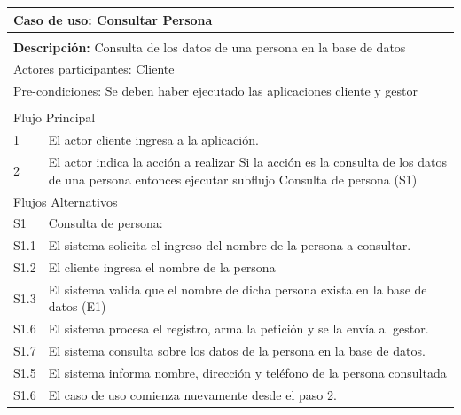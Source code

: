 \documentclass[11pt]{article}
\begin{document}
\begin{tabular}{|l|m{}|}
    \hline
    \multicolumn{2}{|m{0.9\textwidth}|}{{\bf Caso de uso: Consultar Persona}} \\
    \hline
    \multicolumn{2}{|l|}{\rowcolor[gray]{.5}} \\
    \hline
  
    \multicolumn{2}{|p{0.9\textwidth}|}{{\bf Descripción:} Consulta de los datos de una 
    persona en la base de datos } \\
  
    \hline
    \multicolumn{2}{|l|}{Actores participantes: Cliente} \\
    \hline
  
    \multicolumn{2}{|l|}{Pre-condiciones: Se deben haber ejecutado las aplicaciones cliente 
    y gestor} \\
  
    \hline
    \multicolumn{2}{|l|}{\rowcolor[gray]{.5}} \\
    \hline
    \multicolumn{2}{|l|}{Flujo Principal} \\
    \hline
    1 & El actor cliente ingresa a la aplicaci\'on. \\
    \hline
    2 &  El actor indica la acción a realizar \newline
    Si la acción es la consulta de los datos de una persona entonces ejecutar subflujo Consulta de persona (S1)\newline
   \\
    
    \hline
    \multicolumn{2}{|l|}{Flujos Alternativos} \\
    \hline
  
    S1 &  Consulta de persona: \\ \hline
    S1.1 & El sistema solicita el ingreso del nombre de la persona a consultar.\\ \hline
    S1.2 & El cliente ingresa el nombre de la persona\\ \hline
    S1.3 & El sistema valida que el nombre de dicha persona exista en la base de datos (E1) \\ \hline
    S1.6 & El sistema procesa el registro, arma la petici\'on y se la env\'ia al gestor.\\ \hline
    S1.7 & El sistema consulta sobre los datos de la persona en la base de datos.\\ \hline
    S1.5 & El sistema informa nombre, direcci\'on y tel\'efono de la persona consultada\\ \hline
    S1.6 & El caso de uso comienza nuevamente desde el paso 2.\\ \hline
    

\end{tabular}
\end{document}
